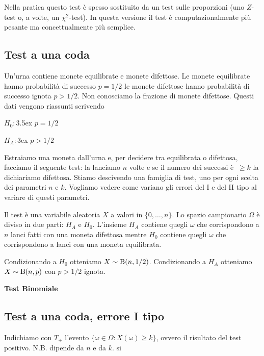 \documentclass[11pt,openany]{book}
\begin{document}
\def\medrel#1{\parbox[t]{6ex}{$\displaystyle\hfil #1$}}
\def\ceq#1#2#3{\parbox[t]{15ex}{$\displaystyle #1$}\medrel{#2}$\displaystyle  #3$}

Nella pratica questo test è spesso sostituito da un test sulle proporzioni (uno $Z$-test o, a volte, un $\chi^2$-test). In questa versione il test è computazionalmente più pesante ma concettualmente più semplice.

\subsection{Test a una coda}\label{Bernoulli_test}

Un'urna contiene monete equilibrate e monete difettose. Le monete equilibrate hanno probabilità di successo $p=1/2$ le monete difettose hanno probabilità di successo ignota $p>1/2$. Non conosciamo la frazione di monete difettose. Questi dati vengono riassunti scrivendo

$H_0:$\kern3.5ex $p=1/2$

$H_A:$\kern3ex $p>1/2$
 
Estraiamo una moneta dall'urna e, per decidere tra equilibrata o difettosa, facciamo il seguente test: la lanciamo $n$ volte e se il numero dei successi è $\ \ge k$ la dichiariamo difettosa. Stiamo descivendo una famiglia di test, uno per ogni scelta dei parametri $n$ e $k$. Vogliamo vedere come variano gli errori del I e del II tipo al variare di questi parametri. 

Il test è una variabile aleatoria $X$ a valori in $\{0,\dots,n\}$. Lo spazio campionario $\Omega$ è diviso in due parti: $H_A$ e $H_0$.  L'insieme $H_A$ contiene quegli $\omega$ che corrispondono a $n$ lanci fatti con una moneta difettosa mentre $H_0$ contiene quegli $\omega$ che corrispondono a lanci con una moneta equilibrata. 

Condizionando a $H_0$ otteniamo $X\sim {\rm B}(n,1/2)$. Condizionando a $H_A$ otteniamo $X\sim {\rm B}(n,p)$ con $p>1/2$ ignota.


\hfill{}\clearpage\hfill\textbf{Test Binomiale}\subsection{Test a una coda, errore I tipo}

Indichiamo con $T_+$ l'evento $\{\omega\in\Omega: X(\omega)\ge k\}$, ovvero il risultato del test positivo. N.B. dipende da $n$ e da $k$.
si
\end{document}
